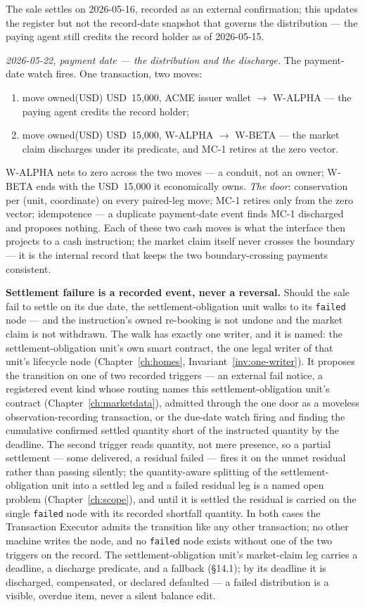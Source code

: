 \documentclass[11pt,a4paper]{article}
\newcommand{\USD}[1]{\mbox{USD~#1}}
\begin{document}
The sale settles on 2026-05-16, recorded as an external confirmation; this updates
the register but not the record-date snapshot that governs the distribution --- the
paying agent still credits the record holder as of 2026-05-15.

\emph{2026-05-22, payment date --- the distribution and the discharge.} The
payment-date watch fires. One transaction, two moves:
\begin{enumerate}[label=(\arabic*),nosep]
\item move owned(USD) \USD{15{,}000}, ACME issuer wallet $\to$ W-ALPHA --- the paying
agent credits the record holder;
\item move owned(USD) \USD{15{,}000}, W-ALPHA $\to$ W-BETA --- the market claim
discharges under its predicate, and MC-1 retires at the zero vector.
\end{enumerate}
W-ALPHA nets to zero across the two moves --- a conduit, not an owner; W-BETA ends
with the \USD{15{,}000} it economically owns. \emph{The door}: conservation per
(unit, coordinate) on every paired-leg move; MC-1 retires only from the zero vector;
idempotence --- a duplicate payment-date event finds MC-1 discharged and proposes
nothing. Each of these two cash moves is what the interface then projects to a cash
instruction; the market claim itself never crosses the boundary --- it is the
internal record that keeps the two boundary-crossing payments consistent.

\medskip\noindent\textbf{Settlement failure is a recorded event, never a reversal.}
Should the sale fail to settle on its due date, the settlement-obligation unit walks
to its \texttt{failed} node --- and the instruction's owned re-booking is not undone
and the market claim is not withdrawn. The walk has exactly one writer, and it is
named: the settlement-obligation unit's own smart contract, the one legal writer of
that unit's lifecycle node (Chapter~\ref{ch:homes}, Invariant~\ref{inv:one-writer}).
It proposes the transition on one of two recorded triggers --- an external fail
notice, a registered event kind whose routing names this settlement-obligation unit's
contract (Chapter~\ref{ch:marketdata}), admitted through the one door as a moveless
observation-recording transaction, or the due-date watch firing and finding the cumulative
confirmed settled quantity short of the instructed quantity by the deadline. The
second trigger reads quantity, not mere presence, so a partial settlement --- some
delivered, a residual failed --- fires it on the unmet residual rather than passing
silently; the quantity-aware splitting of the settlement-obligation unit into a
settled leg and a failed residual leg is a named open problem (Chapter~\ref{ch:scope}),
and until it is settled the residual is carried on the single \texttt{failed} node with
its recorded shortfall quantity. In both cases the Transaction Executor admits the
transition like any other transaction; no other machine writes the node, and no
\texttt{failed} node exists without one of the two triggers on the record. The settlement-obligation unit's market-claim leg carries
a deadline, a discharge predicate, and a fallback (\S14.1); by its deadline it is
discharged, compensated, or declared defaulted --- a failed distribution is a
visible, overdue item, never a silent balance edit.
\end{document}
